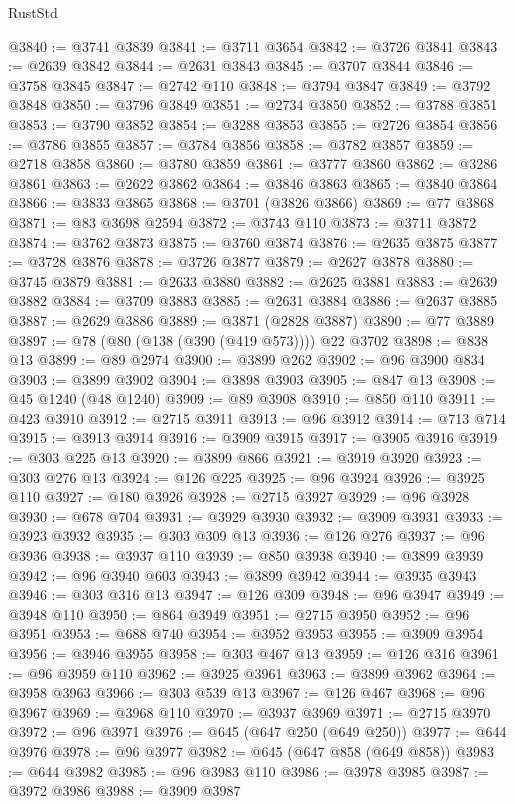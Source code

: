\begin{lexlean}{RustStd}
\begin{coremodule}
@3840 := @3741 @3839
@3841 := @3711 @3654
@3842 := @3726 @3841
@3843 := @2639 @3842
@3844 := @2631 @3843
@3845 := @3707 @3844
@3846 := @3758 @3845
@3847 := @2742 @110
@3848 := @3794 @3847
@3849 := @3792 @3848
@3850 := @3796 @3849
@3851 := @2734 @3850
@3852 := @3788 @3851
@3853 := @3790 @3852
@3854 := @3288 @3853
@3855 := @2726 @3854
@3856 := @3786 @3855
@3857 := @3784 @3856
@3858 := @3782 @3857
@3859 := @2718 @3858
@3860 := @3780 @3859
@3861 := @3777 @3860
@3862 := @3286 @3861
@3863 := @2622 @3862
@3864 := @3846 @3863
@3865 := @3840 @3864
@3866 := @3833 @3865
@3868 := @3701 (@3826 @3866)
@3869 := @77 @3868
@3871 := @83 @3698 @2594
@3872 := @3743 @110
@3873 := @3711 @3872
@3874 := @3762 @3873
@3875 := @3760 @3874
@3876 := @2635 @3875
@3877 := @3728 @3876
@3878 := @3726 @3877
@3879 := @2627 @3878
@3880 := @3745 @3879
@3881 := @2633 @3880
@3882 := @2625 @3881
@3883 := @2639 @3882
@3884 := @3709 @3883
@3885 := @2631 @3884
@3886 := @2637 @3885
@3887 := @2629 @3886
@3889 := @3871 (@2828 @3887)
@3890 := @77 @3889
@3897 := @78 (@80 (@138 (@390 (@419 @573)))) @22 @3702
@3898 := @838 @13
@3899 := @89 @2974
@3900 := @3899 @262
@3902 := @96 @3900 @834
@3903 := @3899 @3902
@3904 := @3898 @3903
@3905 := @847 @13
@3908 := @45 @1240 (@48 @1240)
@3909 := @89 @3908
@3910 := @850 @110
@3911 := @423 @3910
@3912 := @2715 @3911
@3913 := @96 @3912
@3914 := @713 @714
@3915 := @3913 @3914
@3916 := @3909 @3915
@3917 := @3905 @3916
@3919 := @303 @225 @13
@3920 := @3899 @866
@3921 := @3919 @3920
@3923 := @303 @276 @13
@3924 := @126 @225
@3925 := @96 @3924
@3926 := @3925 @110
@3927 := @180 @3926
@3928 := @2715 @3927
@3929 := @96 @3928
@3930 := @678 @704
@3931 := @3929 @3930
@3932 := @3909 @3931
@3933 := @3923 @3932
@3935 := @303 @309 @13
@3936 := @126 @276
@3937 := @96 @3936
@3938 := @3937 @110
@3939 := @850 @3938
@3940 := @3899 @3939
@3942 := @96 @3940 @603
@3943 := @3899 @3942
@3944 := @3935 @3943
@3946 := @303 @316 @13
@3947 := @126 @309
@3948 := @96 @3947
@3949 := @3948 @110
@3950 := @864 @3949
@3951 := @2715 @3950
@3952 := @96 @3951
@3953 := @688 @740
@3954 := @3952 @3953
@3955 := @3909 @3954
@3956 := @3946 @3955
@3958 := @303 @467 @13
@3959 := @126 @316
@3961 := @96 @3959 @110
@3962 := @3925 @3961
@3963 := @3899 @3962
@3964 := @3958 @3963
@3966 := @303 @539 @13
@3967 := @126 @467
@3968 := @96 @3967
@3969 := @3968 @110
@3970 := @3937 @3969
@3971 := @2715 @3970
@3972 := @96 @3971
@3976 := @645 (@647 @250 (@649 @250))
@3977 := @644 @3976
@3978 := @96 @3977
@3982 := @645 (@647 @858 (@649 @858))
@3983 := @644 @3982
@3985 := @96 @3983 @110
@3986 := @3978 @3985
@3987 := @3972 @3986
@3988 := @3909 @3987

\end{coremodule}
\end{lexlean}

